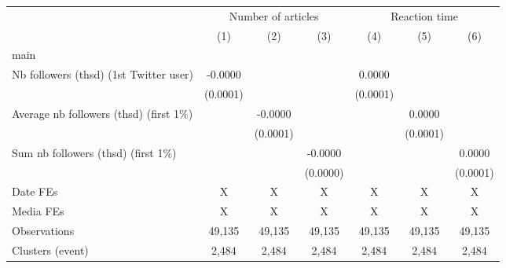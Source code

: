 {
\def\sym#1{\ifmmode^{#1}\else\(^{#1}\)\fi}
\begin{tabular}{l*{6}{c}}
\hline\hline
                    &\multicolumn{3}{c}{Number of articles}                           &\multicolumn{3}{c}{Reaction time}                                \\\cmidrule(lr){2-4}\cmidrule(lr){5-7}
                    &\multicolumn{1}{c}{(1)}         &\multicolumn{1}{c}{(2)}         &\multicolumn{1}{c}{(3)}         &\multicolumn{1}{c}{(4)}         &\multicolumn{1}{c}{(5)}         &\multicolumn{1}{c}{(6)}         \\
\hline
main                &                     &                     &                     &                     &                     &                     \\
Nb followers (thsd) (1st Twitter user)&     -0.0000         &                     &                     &      0.0000         &                     &                     \\
                    &    (0.0001)         &                     &                     &    (0.0001)         &                     &                     \\
Average nb followers (thsd) (first 1$\%$)&                     &     -0.0000         &                     &                     &      0.0000         &                     \\
                    &                     &    (0.0001)         &                     &                     &    (0.0001)         &                     \\
Sum nb followers (thsd) (first 1$\%$)&                     &                     &     -0.0000         &                     &                     &      0.0000         \\
                    &                     &                     &    (0.0000)         &                     &                     &    (0.0001)         \\
\hline
Date FEs            &           X         &           X         &           X         &           X         &           X         &           X         \\
Media FEs           &           X         &           X         &           X         &           X         &           X         &           X         \\
Observations        &      49,135         &      49,135         &      49,135         &      49,135         &      49,135         &      49,135         \\
Clusters (event)    &       2,484         &       2,484         &       2,484         &       2,484         &       2,484         &       2,484         \\
\hline\hline
\end{tabular}
}
